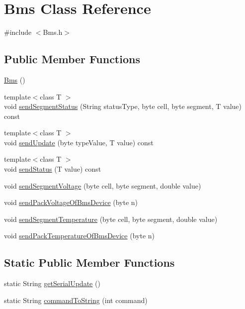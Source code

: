 \hypertarget{class_bms}{}\section{Bms Class Reference}
\label{class_bms}


{\ttfamily \#include $<$Bms.\+h$>$}

\subsection*{Public Member Functions}
\begin{DoxyCompactItemize}
\item 
\hyperlink{class_bms_a5d733fdf4429045471ec8fd56f9ae92e}{Bms} ()
\item 
{\footnotesize template$<$class T $>$ }\\void \hyperlink{class_bms_acb40c808d8fa45d5cf27dabe80c6e508}{send\+Segment\+Status} (String status\+Type, byte cell, byte segment, T value) const 
\item 
{\footnotesize template$<$class T $>$ }\\void \hyperlink{class_bms_acac85da825d6567cc0b1752c95a48e56}{send\+Update} (byte type\+Value, T value) const 
\item 
{\footnotesize template$<$class T $>$ }\\void \hyperlink{class_bms_ac2df5edf6db5cffe6c59967d36f4ab37}{send\+Status} (T value) const 
\item 
void \hyperlink{class_bms_a1ee6832e0d5662961f15bcb2e9021a44}{send\+Segment\+Voltage} (byte cell, byte segment, double value)
\item 
void \hyperlink{class_bms_adf5e55c4858fb8f2b1ecd468f67abed7}{send\+Pack\+Voltage\+Of\+Bms\+Device} (byte n)
\item 
void \hyperlink{class_bms_a2d3dd5589bbb2db1667510f0b3117e0e}{send\+Segment\+Temperature} (byte cell, byte segment, double value)
\item 
void \hyperlink{class_bms_a49cc5412e466fa94f2e6eb585efb88f7}{send\+Pack\+Temperature\+Of\+Bms\+Device} (byte n)
\end{DoxyCompactItemize}
\subsection*{Static Public Member Functions}
\begin{DoxyCompactItemize}
\item 
static String \hyperlink{class_bms_ab068da9c10b0bd7e865cba83fabaaaef}{get\+Serial\+Update} ()
\item 
static String \hyperlink{class_bms_aae88d468c07ca6c7cfdc58de46019b7e}{command\+To\+String} (int command)
\end{DoxyCompactItemize}


